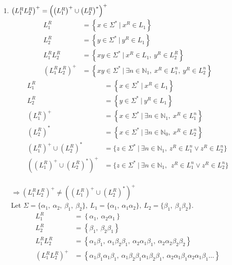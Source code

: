 \documentclass[a4paper,12pt, centered]{article}
\begin{document}
\begin{enumerate}
	\item $\left(L_1^RL_2^R\right)^+=\left(\left(L_1^R \right)^+\cup \left(L_2^R \right)^*\right)^+\\$ \begin{align*}
		L_1^R&=\left\{x\in\Sigma^*\>|\>x^R\in L_1\right\}\\
		L_2^R&=\left\{y\in\Sigma^*\>|\>y^R\in L_1\right\}\\
		L_1^RL_2^R&=\left\{xy\in\Sigma^*\>|\>x^R\in L_1,\>y^R\in L_2^R\right\}\\
		\left(L_1^RL_2^R\right)^+&=\left\{xy\in\Sigma^*\>|\>\exists n\in\mathbb{N}_1,\>x^R\in L_1^n,\>y^R\in L_2^n\right\}
	\end{align*}
	\begin{align*}
		L_1^R&=\left\{x\in\Sigma^*\>|\>x^R\in L_1\right\}\\
		L_2^R&=\left\{y\in\Sigma^*\>|\>y^R\in L_1\right\}\\
		\left(L_1^R\right)^+&=\left\{x\in\Sigma^*\>|\>\exists n\in\mathbb{N}_1,\>x^R\in L_1^n\right\}\\
		\left(L_2^R\right)^*&=\left\{x\in\Sigma^*\>|\>\exists n\in\mathbb{N}_0,\>x^R\in L_2^n\right\}\\
		\left(L_1^R \right)^+\cup \left(L_2^R \right)^*&=\{z\in\Sigma^*\>|\>\exists n\in\mathbb{N}_1,\>z^R\in L_1^n\lor z^R\in L_2^n\}\\
		\left(\left(L_1^R \right)^+\cup \left(L_2^R \right)^*\right)^+&=\{z\in\Sigma^*\>|\>\exists n\in\mathbb{N}_1,\>\>z^R\in L_1^n\lor z^R\in L_2^n \}
	\end{align*}\\$\Rightarrow\left(L_1^RL_2^R\right)^+\neq\left(\left(L_1^R \right)^+\cup \left(L_2^R \right)^*\right)^+$ \\Let $\Sigma=\{\alpha_1,\>\alpha_2,\>\beta_1,\>\beta_2\},\>L_1=\{\alpha_1,\>\alpha_1\alpha_2\},\>L_2=\{\beta_1,\>\beta_1\beta_2\}.$
	\begin{align*}
		L_1^R&=\left\{\alpha_1,\>\alpha_2\alpha_1\right\}\\
		L_2^R&=\left\{\beta_1,\>\beta_2\beta_1\right\}\\
		L_1^RL_2^R&=\left\{\alpha_1\beta_1,\>\alpha_1\beta_2\beta_1,\>\alpha_2\alpha_1\beta_1,\>\alpha_2\alpha_2\beta_2\beta_2\right\}\\
		\left(L_1^RL_2^R\right)^+&=\left\{\alpha_1\beta_1\alpha_1\beta_1,\>\alpha_1\beta_2\beta_1\alpha_1\beta_2\beta_1,\>\alpha_2\alpha_1\beta_1\alpha_2\alpha_1\beta_1\dots \right\}
	\end{align*}

\end{enumerate}
\end{document}
